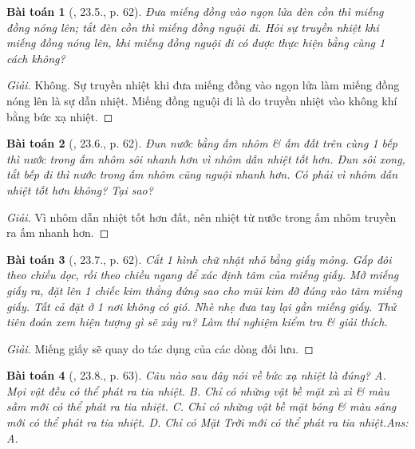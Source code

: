 \documentclass{article}
\newtheorem{baitoan}{Bài toán}
\begin{document}
\begin{baitoan}[\cite{SBT_Vat_Ly_8}, 23.5., p. 62]
	Đưa miếng đồng vào ngọn lửa đèn cồn thì miếng đồng nóng lên; tắt đèn cồn thì miếng đồng nguội đi. Hỏi sự truyền nhiệt khi miếng đồng nóng lên, khi miếng đồng nguội đi có được thực hiện bằng cùng 1 cách không?
\end{baitoan}

\begin{proof}[Giải]
	Không. Sự truyền nhiệt khi đưa miếng đồng vào ngọn lửa làm miếng đồng nóng lên là sự dẫn nhiệt. Miếng đồng nguội đi là do truyền nhiệt vào không khí bằng bức xạ nhiệt.
\end{proof}

\begin{baitoan}[\cite{SBT_Vat_Ly_8}, 23.6., p. 62]
	Đun nước bằng ấm nhôm \& ấm đất trên cùng 1 bếp thì nước trong ấm nhôm sôi nhanh hơn vì nhôm dẫn nhiệt tốt hơn. Đun sôi xong, tắt bếp đi thì nước trong ấm nhôm cũng nguội nhanh hơn. Có phải vì nhôm dẫn nhiệt tốt hơn không? Tại sao?
\end{baitoan}

\begin{proof}[Giải]
	Vì nhôm dẫn nhiệt tốt hơn đất, nên nhiệt từ nước trong ấm nhôm truyền ra ấm nhanh hơn.
\end{proof}

\begin{baitoan}[\cite{SBT_Vat_Ly_8}, 23.7., p. 62]
	Cắt 1 hình chữ nhật nhỏ bằng giấy mỏng. Gấp đôi theo chiều dọc, rồi theo chiều ngang để xác định tâm của miếng giấy. Mở miếng giấy ra, đặt lên 1 chiếc kim thẳng đứng sao cho mũi kim đỡ đúng vào tâm miếng giấy. Tất cả đặt ở 1 nơi không có gió. Nhè nhẹ đưa tay lại gần miếng giấy. Thử tiên đoán xem hiện tượng gì sẽ xảy ra? Làm thí nghiệm kiểm tra \& giải thích.
\end{baitoan}

\begin{proof}[Giải]
	Miếng giấy sẽ quay do tác dụng của các dòng đối lưu.
\end{proof}

\begin{baitoan}[\cite{SBT_Vat_Ly_8}, 23.8., p. 63]
	Câu nào sau đây nói về bức xạ nhiệt là đúng? {\sf A.} Mọi vật đều có thể phát ra tia nhiệt. {\sf B.} Chỉ có những vật bề mặt xù xì \& màu sẫm mới có thể phát ra tia nhiệt. {\sf C.} Chỉ có những vật bề mặt bóng \& màu sáng mới có thể phát ra tia nhiệt. {\sf D.} Chỉ có Mặt Trời mới có thể phát ra tia nhiệt.\hfill{\sf Ans: A.}
\end{baitoan}
\end{document}

